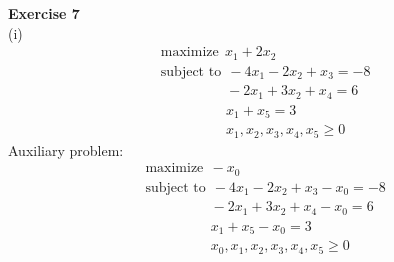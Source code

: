 \documentclass[letterpaper,12pt]{article}
\theoremstyle{definition}
\begin{document}
\textbf{Exercise 7} \\
(i)
\begin{align*}
  &\text{maximize} \ \ x_1 + 2x_2 \\
  &\text{subject to} \ \ -4x_1 - 2x_2 + x_3 = -8 \\
  &\qquad \qquad \ \ \  -2x_1 + 3x_2 + x_4 = 6 \\
  &\qquad \qquad \ \ \  x_1 + x_5 = 3 \\
  &\qquad \qquad \ \ \  x_1, x_2, x_3, x_4, x_5 \geq 0
\end{align*}
Auxiliary problem:
\begin{align*}
  &\text{maximize} \ \ -x_0 \\
  &\text{subject to} \ \ -4x_1 - 2x_2 + x_3 - x_0 = -8 \\
  &\qquad \qquad \ \ \ -2x_1 + 3x_2 + x_4 - x_0 = 6 \\
  &\qquad \qquad \ \ \ x_1 + x_5 - x_0 = 3 \\
  &\qquad \qquad \ \ \  x_0, x_1, x_2, x_3, x_4, x_5 \geq 0
\end{align*}
\end{document}
